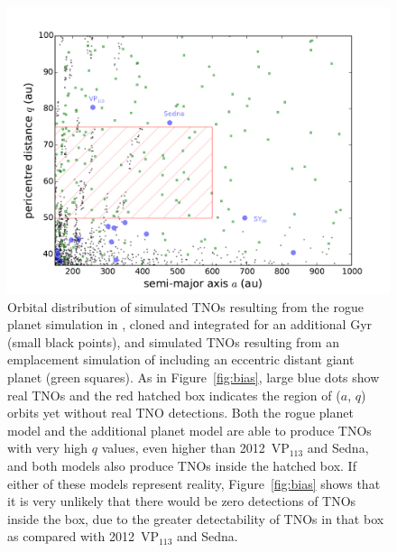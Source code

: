 \documentclass[preprint]{aastex62}
\begin{document}
\begin{figure}

\includegraphics[width=\textwidth]{figures/rogue_aq.pdf}
\caption{Orbital distribution of simulated TNOs resulting from the rogue planet simulation in \citet{gladmanchan06}, cloned and integrated for an additional Gyr (small black points), and simulated TNOs resulting from an emplacement simulation of \citet{lawler2017} including an eccentric distant giant planet (green squares).
As in Figure~\ref{fig:bias}, large blue dots show real TNOs and the red hatched box indicates the region of ($a$, $q$) orbits yet without real TNO detections.
Both the rogue planet model and the additional planet model are able to produce TNOs with very high $q$ values, even higher than 2012~VP$_{113}$ and Sedna, and 
both models also produce TNOs inside the hatched box. 
If either of these models represent reality, Figure~\ref{fig:bias} shows that it is very unlikely that there would be zero detections of TNOs inside the box, due to the greater detectability of TNOs in that box as compared with 2012~VP$_{113}$ and Sedna.
}
\label{fig:rogue}
\end{figure}
\end{document}
